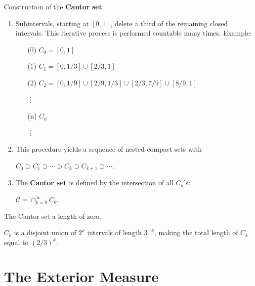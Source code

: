 \documentclass{book}
\newcommand{\cc}{\mathcal{C}}
\begin{document}
Construction of the \textbf{Cantor set}:
\begin{enumerate}
    \item Subintervals, starting at $[0,1]$, delete a third of the remaining closed intervals. This iterative process is performed countable many times. Example:
\begin{enumerate}
    \item[(0)] $C_0=[0,1]$
    \item[(1)] $C_1=[0,1/3]\cup[2/3,1]$
    \item[(2)] $C_2=[0,1/9]\cup[2/9,1/3]\cup[2/3,7/9]\cup[8/9,1]$
    
    \hspace{5pt}\vdots
    \item[(n)] $C_n$
     
    \hspace{5pt}\vdots 
\end{enumerate}
    \item This procedure yields a sequence of nested compact sets with
    \begin{center}
        $C_0\supset C_1\supset\cdots\supset C_k \supset C_{k+1}\supset\cdots$.
    \end{center}
    \item The \textbf{Cantor set} is defined by the intersection of all $C_k$'s:
    \begin{center}
        $\cc=\cap_{k=0}^{\infty}C_k$.
    \end{center}
\end{enumerate}

The Cantor set a length of zero.

$C_k$ is a disjoint union of $2^k$ intervals of length $3^{-k}$, making the total length of $C_k$ equal to $(2/3)^k$.

\section{The Exterior Measure}
\end{document}
